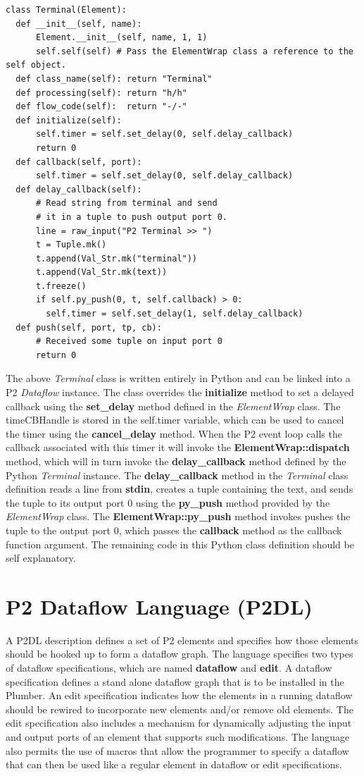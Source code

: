\documentclass[12pt]{article}
\begin{document}
\begin{verbatim}
class Terminal(Element):
  def __init__(self, name):
      Element.__init__(self, name, 1, 1)
      self.self(self) # Pass the ElementWrap class a reference to the self object.
  def class_name(self): return "Terminal"
  def processing(self): return "h/h"
  def flow_code(self):  return "-/-"
  def initialize(self):
      self.timer = self.set_delay(0, self.delay_callback)
      return 0
  def callback(self, port):
      self.timer = self.set_delay(0, self.delay_callback)
  def delay_callback(self):
      # Read string from terminal and send 
      # it in a tuple to push output port 0.
      line = raw_input("P2 Terminal >> ")
      t = Tuple.mk()
      t.append(Val_Str.mk("terminal"))
      t.append(Val_Str.mk(text))
      t.freeze()
      if self.py_push(0, t, self.callback) > 0:
        self.timer = self.set_delay(1, self.delay_callback)
  def push(self, port, tp, cb):
      # Received some tuple on input port 0
      return 0
\end{verbatim}

The above \emph{Terminal} class is written entirely in Python and can be linked
into a P2 \emph{Dataflow} instance. The class overrides the {\bf initialize} method
to set a delayed callback using the {\bf set\_delay} method defined in the 
\emph{ElementWrap} class. The timeCBHandle is stored in the self.timer variable, which
can be used to cancel the timer using the {\bf cancel\_delay} method. 
When the P2 event loop calls the callback associated
with this timer it will invoke the {\bf ElementWrap::dispatch} method, which will
in turn invoke the {\bf delay\_callback} method defined by the Python \emph{Terminal}
instance. The {\bf delay\_callback} method in the \emph{Terminal} class definition
reads a line from {\bf stdin}, creates a tuple containing the text, and sends the tuple
to its output port $0$ using the {\bf py\_push} method provided by the 
\emph{ElementWrap} class. The {\bf ElementWrap::py\_push} method invokes pushes
the tuple to the output port $0$, which passes the {\bf callback} method as
the callback function argument. The remaining code in this Python class definition 
should be self explanatory.

\section{P2 Dataflow Language (P2DL)}
\label{sec:p2dl}

A P2DL description defines a set of P2 elements and specifies how those elements
should be hooked up to form a dataflow graph. The language specifies two types
of dataflow specifications, which are named {\bf dataflow} and {\bf edit}. A dataflow 
specification defines a stand alone dataflow graph that is to
be installed in the Plumber.
An edit specification indicates how the
elements in a running dataflow should be rewired to incorporate new elements and/or 
remove old elements. The edit specification also includes a mechanism for dynamically adjusting the 
input and output ports of an element that supports such modifications. The language also
permits the use of macros that allow the programmer to specify a dataflow that can then be used 
like a regular element in dataflow or edit specifications.
\end{document}

